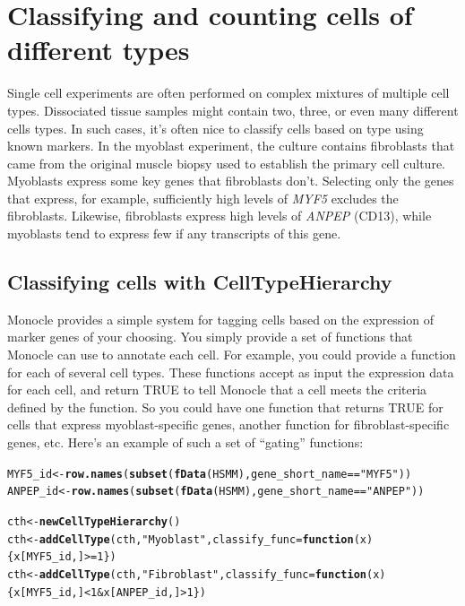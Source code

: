 \documentclass[10pt,oneside]{article}\usepackage[]{graphicx}\usepackage[]{color}
\makeatletter
\newcommand{\hlnum}[1]{\textcolor[rgb]{0.686,0.059,0.569}{#1}}%
\newcommand{\hlstr}[1]{\textcolor[rgb]{0.192,0.494,0.8}{#1}}%
\newcommand{\hlopt}[1]{\textcolor[rgb]{0,0,0}{#1}}%
\newcommand{\hlstd}[1]{\textcolor[rgb]{0.345,0.345,0.345}{#1}}%
\newcommand{\hlkwa}[1]{\textcolor[rgb]{0.161,0.373,0.58}{\textbf{#1}}}%
\newcommand{\hlkwb}[1]{\textcolor[rgb]{0.69,0.353,0.396}{#1}}%
\newcommand{\hlkwc}[1]{\textcolor[rgb]{0.333,0.667,0.333}{#1}}%
\newcommand{\hlkwd}[1]{\textcolor[rgb]{0.737,0.353,0.396}{\textbf{#1}}}%
\newenvironment{kframe}{%
 \def\at@end@of@kframe{}%
 \ifinner\ifhmode%
  \def\at@end@of@kframe{\end{minipage}}%
  \begin{minipage}{\columnwidth}%
 \fi\fi%
 \def\FrameCommand##1{\hskip\@totalleftmargin \hskip-\fboxsep
 \colorbox{shadecolor}{##1}\hskip-\fboxsep
     \hskip-\linewidth \hskip-\@totalleftmargin \hskip\columnwidth}%
 \MakeFramed {\advance\hsize-\width
   \@totalleftmargin\z@ \linewidth\hsize
   \@setminipage}}%
 {\par\unskip\endMakeFramed%
 \at@end@of@kframe}
\newenvironment{knitrout}{}{} %
\makeatother
\begin{document}
 \section{Classifying and counting cells of different types}
 
 Single cell experiments are often performed on complex mixtures of multiple cell types. Dissociated tissue samples might contain two, three, or even many different cells types. In such cases, it's often nice to classify cells based on type using known markers. In the myoblast experiment, the culture contains fibroblasts that came from the original muscle biopsy used to establish the primary cell culture.  Myoblasts express some key genes that fibroblasts don't. Selecting only the genes that express, for example, sufficiently high levels of \emph{MYF5} excludes the fibroblasts. Likewise, fibroblasts express high levels of \emph{ANPEP} (CD13), while myoblasts tend to express few if any transcripts of this gene. 
 
 \subsection{Classifying cells with CellTypeHierarchy}
 Monocle provides a simple system for tagging cells based on the expression of marker genes of your choosing. You simply provide a set of functions that Monocle can use to annotate each cell. For example, you could provide a function for each of several cell types. These functions accept as input the expression data for each cell, and return TRUE to tell Monocle that a cell meets the criteria defined by the function. So you could have one function that returns TRUE for cells that express myoblast-specific genes, another function for fibroblast-specific genes, etc. Here's an example of such a set of ``gating'' functions:
 
\begin{knitrout}
\color{fgcolor}\begin{kframe}
\begin{alltt}
\hlstd{MYF5_id} \hlkwb{<-} \hlkwd{row.names}\hlstd{(}\hlkwd{subset}\hlstd{(}\hlkwd{fData}\hlstd{(HSMM), gene_short_name} \hlopt{==} \hlstr{"MYF5"}\hlstd{))}
\hlstd{ANPEP_id} \hlkwb{<-} \hlkwd{row.names}\hlstd{(}\hlkwd{subset}\hlstd{(}\hlkwd{fData}\hlstd{(HSMM), gene_short_name} \hlopt{==} \hlstr{"ANPEP"}\hlstd{))}

\hlstd{cth} \hlkwb{<-} \hlkwd{newCellTypeHierarchy}\hlstd{()}
\hlstd{cth} \hlkwb{<-} \hlkwd{addCellType}\hlstd{(cth,} \hlstr{"Myoblast"}\hlstd{,} \hlkwc{classify_func}\hlstd{=}\hlkwa{function}\hlstd{(}\hlkwc{x}\hlstd{) \{x[MYF5_id,]} \hlopt{>=} \hlnum{1}\hlstd{\})}
\hlstd{cth} \hlkwb{<-} \hlkwd{addCellType}\hlstd{(cth,} \hlstr{"Fibroblast"}\hlstd{,} \hlkwc{classify_func}\hlstd{=}\hlkwa{function}\hlstd{(}\hlkwc{x}\hlstd{)}
       \hlstd{\{x[MYF5_id,]} \hlopt{<} \hlnum{1} \hlopt{&} \hlstd{x[ANPEP_id,]} \hlopt{>} \hlnum{1}\hlstd{\})}
\end{alltt}
\end{kframe}
\end{knitrout}
 
\end{document}
